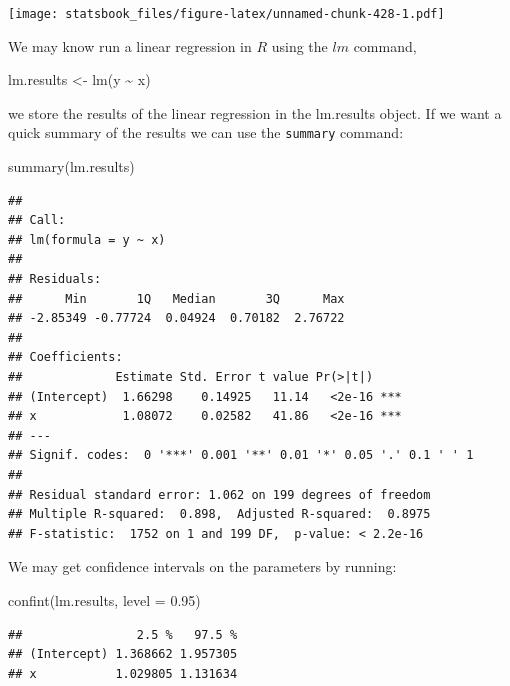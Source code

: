 \documentclass[
]{book}
\newenvironment{Shaded}{\begin{snugshade}}{\end{snugshade}}
\newcommand{\AttributeTok}[1]{\textcolor[rgb]{0.77,0.63,0.00}{#1}}
\newcommand{\FloatTok}[1]{\textcolor[rgb]{0.00,0.00,0.81}{#1}}
\newcommand{\FunctionTok}[1]{\textcolor[rgb]{0.00,0.00,0.00}{#1}}
\newcommand{\NormalTok}[1]{#1}
\newcommand{\OtherTok}[1]{\textcolor[rgb]{0.56,0.35,0.01}{#1}}
\newcommand{\SpecialCharTok}[1]{\textcolor[rgb]{0.00,0.00,0.00}{#1}}
\theoremstyle{definition}
\theoremstyle{definition}
\theoremstyle{definition}
\theoremstyle{definition}
\theoremstyle{remark}
\begin{document}
\texttt{[image: statsbook\_files/figure-latex/unnamed-chunk-428-1.pdf]}

We may know run a linear regression in \(R\) using the \(lm\) command,

\begin{Shaded}
\begin{Highlighting}[]
\NormalTok{lm.results }\OtherTok{\textless{}{-}} \FunctionTok{lm}\NormalTok{(y }\SpecialCharTok{\textasciitilde{}}\NormalTok{ x)}
\end{Highlighting}
\end{Shaded}

we store the results of the linear regression in the lm.results object. If we want a quick summary of the results we can use the \texttt{summary} command:

\begin{Shaded}
\begin{Highlighting}[]
\FunctionTok{summary}\NormalTok{(lm.results)}
\end{Highlighting}
\end{Shaded}

\begin{verbatim}
## 
## Call:
## lm(formula = y ~ x)
## 
## Residuals:
##      Min       1Q   Median       3Q      Max 
## -2.85349 -0.77724  0.04924  0.70182  2.76722 
## 
## Coefficients:
##             Estimate Std. Error t value Pr(>|t|)    
## (Intercept)  1.66298    0.14925   11.14   <2e-16 ***
## x            1.08072    0.02582   41.86   <2e-16 ***
## ---
## Signif. codes:  0 '***' 0.001 '**' 0.01 '*' 0.05 '.' 0.1 ' ' 1
## 
## Residual standard error: 1.062 on 199 degrees of freedom
## Multiple R-squared:  0.898,  Adjusted R-squared:  0.8975 
## F-statistic:  1752 on 1 and 199 DF,  p-value: < 2.2e-16
\end{verbatim}

We may get confidence intervals on the parameters by running:

\begin{Shaded}
\begin{Highlighting}[]
\FunctionTok{confint}\NormalTok{(lm.results, }\AttributeTok{level =} \FloatTok{0.95}\NormalTok{)}
\end{Highlighting}
\end{Shaded}

\begin{verbatim}
##                2.5 %   97.5 %
## (Intercept) 1.368662 1.957305
## x           1.029805 1.131634
\end{verbatim}
\end{document}
